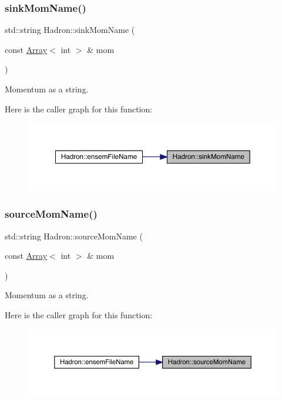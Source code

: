 \subsubsection{\texorpdfstring{sinkMomName()}{sinkMomName()}}
{\footnotesize\ttfamily std\+::string Hadron\+::sink\+Mom\+Name (\begin{DoxyParamCaption}\item[{const \mbox{\hyperlink{classXMLArray_1_1Array}{Array}}$<$ int $>$ \&}]{mom }\end{DoxyParamCaption})}



Momentum as a string. 

Here is the caller graph for this function\+:\nopagebreak
\begin{figure}[H]
\begin{center}
\leavevmode
\includegraphics[width=350pt]{d1/daf/namespaceHadron_aaa6ace3b1a5c63de278a8bcb9fa80c49_icgraph}
\end{center}
\end{figure}
\mbox{\label{namespaceHadron_addad39b9d17263485541d757bb712420}} 
\subsubsection{\texorpdfstring{sourceMomName()}{sourceMomName()}}
{\footnotesize\ttfamily std\+::string Hadron\+::source\+Mom\+Name (\begin{DoxyParamCaption}\item[{const \mbox{\hyperlink{classXMLArray_1_1Array}{Array}}$<$ int $>$ \&}]{mom }\end{DoxyParamCaption})}



Momentum as a string. 

Here is the caller graph for this function\+:\nopagebreak
\begin{figure}[H]
\begin{center}
\leavevmode
\includegraphics[width=350pt]{d1/daf/namespaceHadron_addad39b9d17263485541d757bb712420_icgraph}
\end{center}
\end{figure}
\mbox{\label{namespaceHadron_ae0f88dc43657f9dd4f118d41608859cc}} 
